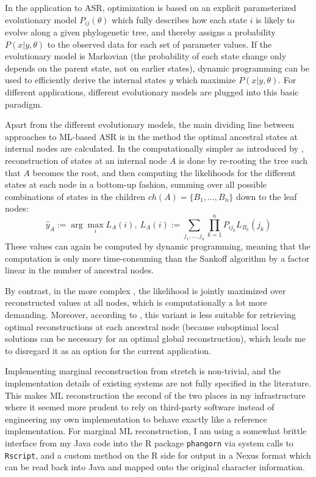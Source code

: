 In the application to ASR, optimization is based on an explicit parameterized evolutionary model $P_{ij}(\theta)$ which fully describes how each state $i$ is likely to evolve along a given phylogenetic tree, and thereby assigns a probability $P(x|y,\theta)$ to the observed data for each set of parameter values. If the evolutionary model is Markovian (the probability of each state change only depends on the parent state, not on earlier states), dynamic programming can be used to efficiently derive the internal states $y$ which maximize $P(x|y,\theta)$. For different applications, different evolutionary models are plugged into this basic paradigm.

Apart from the different evolutionary models, the main dividing line between approaches to ML-based ASR is in the method the optimal ancestral states at internal nodes are calculated. In the computationally simpler  as introduced by \cite{yang_ea_1995}, reconstruction of states at an internal node $A$ is done by re-rooting the tree such that $A$ becomes the root, and then computing the likelihoods for the different states at each node in a bottom-up fashion, summing over all possible combinations of states in the children $ch(A) = \{B_1,\dots,B_n\}$ down to the leaf nodes:
\begin{equation}
 \hat{y}_A :=  \arg \max_i L_A(i),\ L_A(i) := \sum_{j_1,\dots,j_n} \prod_{k=1}^n P_{ij_k}L_{B_k}(j_k)
\end{equation}
These values can again be computed by dynamic programming, meaning that the computation is only more time-consuming than the Sankoff algorithm by a factor linear in the number of ancestral nodes.

By contrast, in the more complex , the likelihood is jointly maximized over reconstructed values at all nodes, which is computationally a lot more demanding. Moreover, according to \cite{yang_ea_1995}, this variant is less suitable for retrieving optimal reconstructions at each ancestral node (because suboptimal local solutions can be necessary for an optimal global reconstruction), which leads me to disregard it as an option for the current application.

Implementing marginal reconstruction from stretch is non-trivial, and the implementation details of existing systems are not fully specified in the literature. This makes ML reconstruction the second of the two places in my infrastructure where it seemed more prudent to rely on third-party software instead of engineering my own implementation to behave exactly like a reference implementation. For marginal ML reconstruction, I am using a somewhat brittle interface from my Java code into the R package \texttt{phangorn} via system calls to \texttt{Rscript}, and a custom method on the R side for output in a Nexus format which can be read back into Java and mapped onto the original character information.

